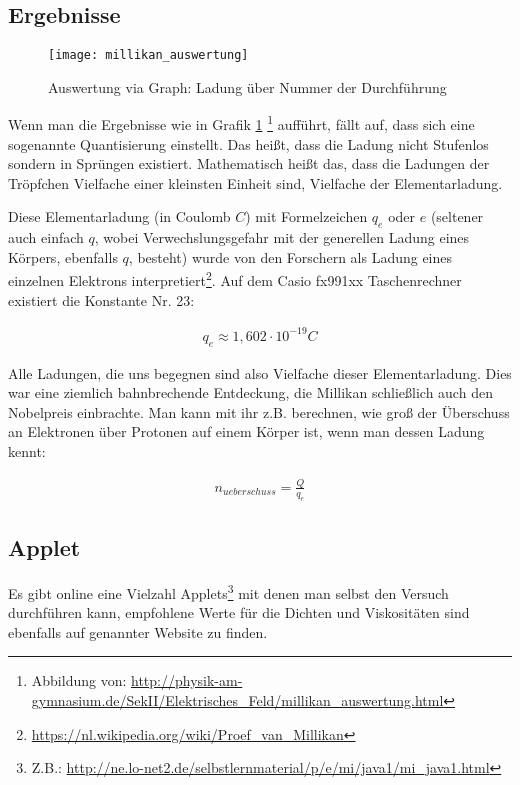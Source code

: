 \subsection{Ergebnisse}

\begin{figure}[h!]
	\center
	\texttt{[image: millikan\_auswertung]}
	\caption{Auswertung via Graph: Ladung über Nummer der Durchführung}
	\vspace*{-10pt}
	\label{fig:millikan_auswertung}
\end{figure}

Wenn man die Ergebnisse wie in Grafik \ref{fig:millikan_auswertung} \footnote{Abbildung von: \url{http://physik-am-gymnasium.de/SekII/Elektrisches_Feld/millikan_auswertung.html}} aufführt, fällt auf, dass sich eine sogenannte Quantisierung einstellt. Das heißt, dass die Ladung nicht \glqq Stufenlos\grqq{} sondern in \glqq Sprüngen\grqq{} existiert. Mathematisch heißt das, dass die Ladungen der Tröpfchen Vielfache einer kleinsten Einheit sind, Vielfache der \glqq Elementarladung\grqq .

Diese Elementarladung (in Coulomb $C$) mit Formelzeichen $q_e$ oder $e$ (seltener auch einfach $q$, wobei Verwechslungsgefahr mit der generellen Ladung eines Körpers, ebenfalls $q$, besteht) wurde von den Forschern als Ladung eines einzelnen Elektrons interpretiert\footnote{\url{https://nl.wikipedia.org/wiki/Proef_van_Millikan}}. Auf dem Casio fx991xx Taschenrechner existiert die Konstante Nr. 23:

\begin{align}
	q_e \approx 1,602 \cdot 10^{-19} C
\end{align}

Alle Ladungen, die uns begegnen sind also Vielfache dieser Elementarladung. Dies war eine ziemlich bahnbrechende Entdeckung, die Millikan schließlich auch den Nobelpreis einbrachte. Man kann mit ihr z.B. berechnen, wie groß der Überschuss an Elektronen über Protonen auf einem Körper ist, wenn man dessen Ladung kennt:

\begin{align}
	n_{ueberschuss} = \frac{Q}{q_e}
\end{align}


\subsection{Applet}

Es gibt online eine Vielzahl Applets\footnote{Z.B.: \url{http://ne.lo-net2.de/selbstlernmaterial/p/e/mi/java1/mi_java1.html}} mit denen man selbst den Versuch durchführen kann, empfohlene Werte für die Dichten und Viskositäten sind ebenfalls auf genannter Website zu finden.




